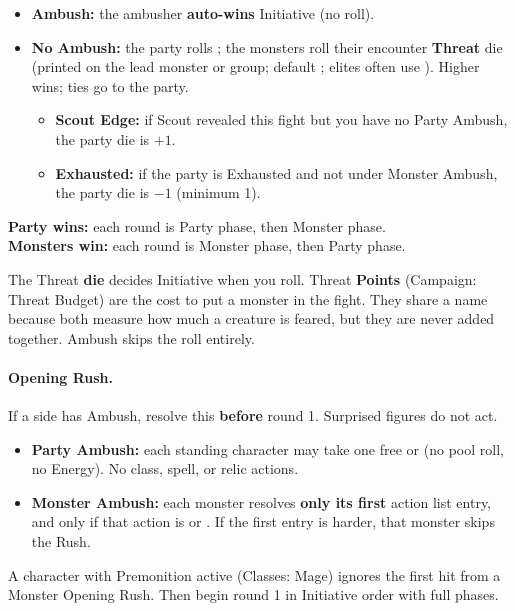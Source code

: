 \begin{itemize}
    \item \textbf{Ambush:} the ambusher \textbf{auto-wins} Initiative (no roll).
    \item \textbf{No Ambush:} the party rolls ; the monsters roll their encounter \textbf{Threat} die (printed on the lead monster or group; default ; elites often use ). Higher wins; ties go to the party.
    \begin{itemize}
        \item \textbf{Scout Edge:} if Scout revealed this fight but you have no Party Ambush, the party die is $+1$.
        \item \textbf{Exhausted:} if the party is Exhausted and not under Monster Ambush, the party die is ${-1}$ (minimum 1).
    \end{itemize}
\end{itemize}

\textbf{Party wins:} each round is Party phase, then Monster phase.\\
\textbf{Monsters win:} each round is Monster phase, then Party phase.

The Threat \textbf{die} decides Initiative when you roll. Threat \textbf{Points} (Campaign: Threat Budget) are the cost to put a monster in the fight. They share a name because both measure how much a creature is feared, but they are never added together. Ambush skips the roll entirely.

\paragraph{Opening Rush.}
If a side has Ambush, resolve this \textbf{before} round 1. Surprised figures do not act.

\begin{itemize}
    \item \textbf{Party Ambush:} each standing character may take one free  or  (no pool roll, no Energy). No class, spell, or relic actions.
    \item \textbf{Monster Ambush:} each monster resolves \textbf{only its first} action list entry, and only if that action is \easy{} or \negligible. If the first entry is harder, that monster skips the Rush.
\end{itemize}

A character with Premonition active (Classes: Mage) ignores the first hit from a Monster Opening Rush.
Then begin round 1 in Initiative order with full phases.

